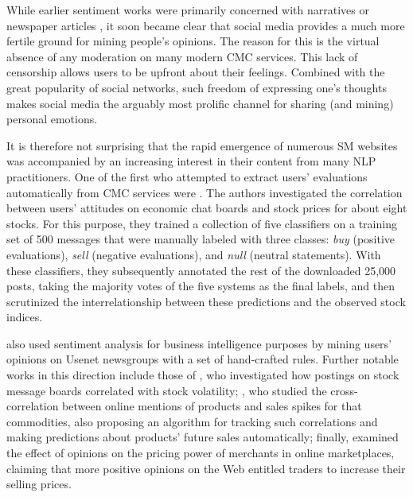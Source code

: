 While earlier sentiment works were primarily concerned with narratives
\citep{Wiebe:90a,Wiebe:94} or newspaper articles
\citep{Wiebe:03,Wiebe:05,Bautin:08}, it soon became clear that social
media provides a much more fertile ground for mining people's
opinions.  The reason for this is the virtual absence of any
moderation on many modern CMC services.  This lack of censorship
allows users to be upfront about their feelings.  Combined with the
great popularity of social networks, such freedom of expressing one's
thoughts makes social media the arguably most prolific channel for
sharing (and mining) personal emotions.

It is therefore not surprising that the rapid emergence of numerous SM
websites was accompanied by an increasing interest in their content
from many NLP practitioners.  One of the first who attempted to
extract users' evaluations automatically from CMC services were
\citet{Das:01}.  The authors investigated the correlation between
users' attitudes on economic chat boards and stock prices for about
eight stocks.  For this purpose, they trained a collection of five
classifiers on a training set of 500 messages that were manually
labeled with three classes: \emph{buy} (positive evaluations),
\emph{sell} (negative evaluations), and \emph{null} (neutral
statements).  With these classifiers, they subsequently annotated the
rest of the downloaded 25,000 posts, taking the majority votes of the
five systems as the final labels, and then scrutinized the
interrelationship between these predictions and the observed stock
indices.

\citet{Glance:05} also used sentiment analysis for business
intelligence purposes by mining users' opinions on Usenet newsgroups
with a set of hand-crafted rules.  Further notable works in this
direction include those of \citet{Antweiler:04}, who investigated how
postings on stock message boards correlated with stock volatility;
\citet{Gruhl:05}, who studied the cross-correlation between online
mentions of products and sales spikes for that commodities, also
proposing an algorithm for tracking such correlations and making
predictions about products' future sales automatically; finally,
\citet{Ghose:07} examined the effect of opinions on the pricing power
of merchants in online marketplaces, claiming that more positive
opinions on the Web entitled traders to increase their selling prices.

